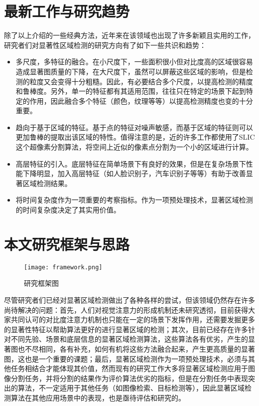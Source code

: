 \section{最新工作与研究趋势}
除了以上介绍的一些经典方法，近年来在该领域也出现了许多新颖且实用的工作\cite{borji2012salient}\cite{yan2013hierarchical}\cite{shi2013pisa}\cite{wei2012geodesic}，研究者们对显著性区域检测的研究方向有了如下一些共识和趋势：
\begin{itemize}
\item 多尺度，多特征的融合。在小尺度下，一些面积很小但对比度高的区域很容易造成显著图质量的下降，在大尺度下，虽然可以屏蔽这些区域的影响，但是检测的粒度又会变得十分粗糙。因此，有必要结合多个尺度，以提高检测的精度和鲁棒度。另外，单一的特征都有其适用范围，往往只在特定的场景下起到特定的作用，因此融合多个特征（颜色，纹理等等）以提高检测精度也变的十分重要。
\item 趋向于基于区域的特征。基于点的特征对噪声敏感，而基于区域的特征则可以更加鲁棒的提取出该区域的特性。值得注意的是，近的许多工作都使用了SLIC\cite{achanta2010slic}这个超像素分割算法，将空间上近似的像素点分割为一个小的区域进行计算。
\item 高层特征的引入。底层特征在简单场景下有良好的效果，但是在复杂场景下性能下降明显，加入高层特征（如人脸识别子，汽车识别子等等）有助于改善显著区域检测结果。
\item 将时间复杂度作为一项重要的考察指标。作为一项预处理技术，显著区域检测的时间复杂度决定了其实用价值。
\end{itemize}

\section{本文研究框架与思路}
\begin{figure}[h]
\centering
\texttt{[image: framework.png]}
\caption{研究框架图} \label{fig:framework}
\end{figure}

尽管研究者们已经对显著区域检测做出了各种各样的尝试，但该领域仍然存在许多尚待解决的问题：首先，人们对视觉注意力的形成机制还未研究透彻，目前获得大家共同认可的对比度注意力机制也只能在一定的场景下发挥作用，还需要发掘更多的显著性特征以帮助算法更好的进行显著区域的检测；其次，目前已经存在许多针对不同先验、场景和底层信息的显著区域检测算法，这些算法各有优劣，产生的显著图也不尽相同，各有补充，如何有机将这些方法融合起来，产生更高质量的显著图，这也是一个重要的课题；最后，显著区域检测作为一项预处理技术，必须与其他任务相结合才能体现其价值，然而现有的研究工作大多将显著区域检测应用于图像分割任务，并将分割的结果作为评价算法优劣的指标，但是在分割任务中表现突出的算法，不一定适用于其他任务（如图像检索、目标检测等），因此显著区域检测算法在其他应用场景中的表现，也是亟待评估和研究的。

